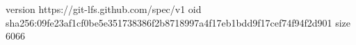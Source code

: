 version https://git-lfs.github.com/spec/v1
oid sha256:09fe23af1cf0be5e351738386f2b8718997a4f17eb1bdd9f17cef74f94f2d901
size 6066
